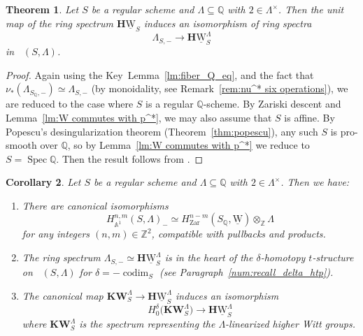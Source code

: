 \documentclass[JEP,XML,SOM,Unicode]{cedram}
\newcommand{\tstructure}{$t$-structure\xspace}
\renewcommand{\AA}{\mathbb A}
\newcommand{\KW}{\mathbf{KW}}
\newcommand{\uW}{\underline{\mathrm W}}
\newcommand{\HuW}{\mathbf H \underline{\mathrm W}}
\DeclareMathOperator{\codim}{codim}
\DeclareMathOperator{\DA}{D_{\AA^1}}
\DeclareMathOperator{\spec}{Spec}
\newcommand{\ZZ} {\mathbb Z}
\newcommand{\QQ} {\mathbb Q}
\newcommand{\zar}{\mathrm{Zar}}
\newtheorem{thm}{Theorem}[section]
\newtheorem{cor}[thm]{Corollary}
\theoremstyle{remark}
\theoremstyle{definition}
\numberwithin{equation}{thm}
\begin{document}
\begin{thm}\label{thm:Witt motives}
Let $S$ be a regular scheme and $\Lambda \subseteq \QQ$ with $2 \in \Lambda^\times$.
Then the unit map of the ring spectrum $\HuW_S$ induces an isomorphism of ring spectra
\begin{equation*}\label{eq:W unit}
\Lambda_{S,-} \to \HuW^\Lambda_S
\end{equation*}
in $\DA(S, \Lambda)$.
\end{thm}
\begin{proof}
Again using the Key~Lemma~\ref{lm:fiber_Q_eq}, and the fact that $\nu_*(\Lambda_{S_\QQ,-}) \simeq \Lambda_{S,-}$ (by monoidality, see Remark~\ref{rem:nu^* six operations}), we are reduced to the case where $S$ is a regular $\QQ$\nobreakdash-scheme.
By Zariski descent \cite[2.3.8]{CD3} and Lemma~\ref{lm:W commutes with p^*}, we may also assume that $S$ is affine.
By Popescu's desingularization theorem (Theorem~\ref{thm:popescu}), any such $S$ is pro-smooth over $\QQ$, so by Lemma~\ref{lm:W commutes with p^*} we reduce to $S=\spec{\QQ}$.
Then the result follows from \cite[Prop.\,41]{Bachmann}.
\end{proof}

\pagebreak[2]
\begin{cor}\label{cor:comput_HA1minus}
Let $S$ be a regular scheme and $\Lambda \subseteq \QQ$ with $2 \in \Lambda^\times$.
Then we have:
\begin{enumerate}
\item
There are canonical isomorphisms
\[
H^{n,m}_{\AA^1}(S,\Lambda)_- \simeq H^{n-m}_\zar(S_\QQ,\uW) \otimes_\ZZ \Lambda
\]
for any integers $(n,m) \in \ZZ^2$, compatible with pullbacks and products.

\item
The ring spectrum $\Lambda_{S,-} \simeq \HuW_S^\Lambda$ is in the heart of the $\delta$-homotopy \tstructure on $\DA(S,\Lambda)$ for $\delta=-\codim_S$ (see Paragraph~\ref{num:recall_delta_htp}).

\item
The canonical map $\KW_S^\Lambda \to \HuW^\Lambda_S$ induces an isomorphism
\[
H_0^\delta\big(\KW_S^\Lambda\big) \to \HuW^\Lambda_S
\]
where $\KW_S^\Lambda$ is the spectrum representing the $\Lambda$-linearized higher Witt groups.
\end{enumerate}
\end{cor}
\end{document}
